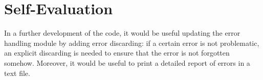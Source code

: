 \documentclass[rmp,10pt,onecolumn,fleqn,notitlepage]{revtex4-1}
\begin{document}
\section{Self-Evaluation}
In a further development of the code, it would be useful updating the error handling module by adding error discarding: if a certain error is not problematic, an explicit discarding is needed to ensure that the error is not forgotten somehow. Moreover, it would be useful to print a detailed report of errors in a text file.



\end{document}
